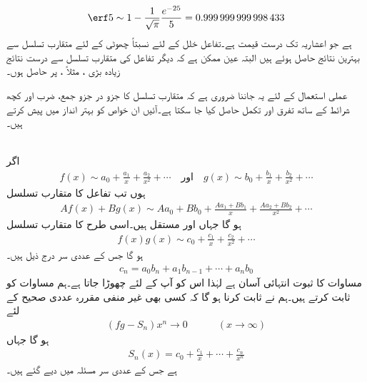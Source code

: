 \begin{align*}
\erf 5\sim 1-\frac{1}{\sqrt{\pi}}\frac{e^{-25}}{5}=\num{0.999999999998433}
\end{align*}
ہے جو  اعشاریہ تک درست قیمت ہے۔تفاعل خلل کے لئے نسبتاً چھوٹی  کے لئے متقارب تسلسل سے  بہترین نتائج حاصل ہوئے ہیں البتہ عین ممکن ہے کہ دیگر تفاعل کی متقارب تسلسل سے درست نتائج  زیادہ بڑی ، مثلاً ، پر حاصل ہوں۔

عملی استعمال کے لئے یہ جاننا ضروری ہے کہ متقارب تسلسل کا جزو در جزو جمع، ضرب اور کچھ شرائط کے ساتھ تفرق اور تکمل حاصل کیا جا سکتا ہے۔آئیں ان خواص کو بہتر انداز میں پیش کرتے ہیں۔

\quad {}\\
اگر 
\begin{align*}
f(x)\sim a_0+\frac{a_1}{x}+\frac{a_2}{x^2}+\cdots\quad \text{اور}\quad g(x)\sim b_0+\frac{b_1}{x}+\frac{b_2}{x^2}+\cdots
\end{align*}
ہوں تب تفاعل  کا متقارب تسلسل
\begin{align}\label{مساوات_اعدادی_مجموعہ_متقارب_الف}
Af(x)+Bg(x)\sim Aa_0+Bb_0+\frac{Aa_1+Bb_1}{x}+\frac{Aa_2+Bb_2}{x^2}+\cdots
\end{align}
ہو گا جہاں  اور  مستقل ہیں۔اسی طرح  کا متقارب تسلسل
\begin{align}\label{مساوات_اعدادی_مجموعہ_متقارب_ب}
f(x)g(x)\sim c_0+\frac{c_1}{x}+\frac{c_2}{x^2}+\cdots
\end{align}
ہو گا جس کے عددی سر درج ذیل ہیں۔
\begin{align*}
c_n=a_0b_n+a_1b_{n-1}+\cdots+a_nb_0
\end{align*}
\quad
مساوات  کا ثبوت انتہائی آسان ہے لہٰذا اس کو آپ کے لئے چھوڑا جاتا ہے۔ہم مساوات  کو ثابت کرتے ہیں۔ہم نے ثابت کرنا ہو گا کہ کسی بھی غیر منفی مقررہ عددی صحیح  کے لئے
\begin{align}\label{مساوات_اعدادی_مجموعہ_متقارب_پ}
(fg-S_n)x^n\to 0 \quad \quad \quad (x\to\infty)
\end{align}
ہو گا جہاں
\begin{align*}
S_n(x)=c_0+\frac{c_1}{x}+\cdots+\frac{c_n}{x^n}
\end{align*}
ہے جس کے عددی سر  مسئلہ میں دیے گئے ہیں۔


